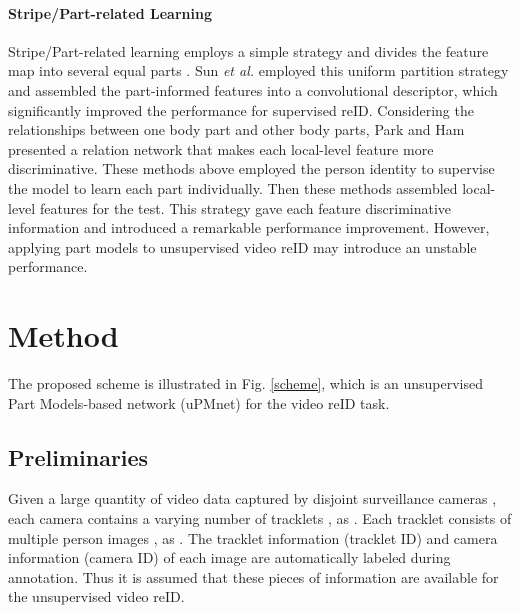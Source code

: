 \documentclass{cta-author}
\begin{document}
	\paragraph{Stripe/Part-related Learning}
	Stripe/Part-related learning employs a simple strategy and divides the feature map into several equal parts \cite{RN191} \cite{RN314}. Sun \textit{et al.} \cite{RN191} employed this uniform partition strategy and assembled the part-informed features into a convolutional descriptor, which significantly improved the performance for supervised reID. Considering the relationships between one body part and other body parts, Park and Ham \cite{RN314} presented a relation network that makes each local-level feature more discriminative. These methods above employed the person identity to supervise the model to learn each part individually. Then these methods assembled local-level features for the test. This strategy gave each feature discriminative information and introduced a remarkable performance improvement. However, applying part models to unsupervised video reID may introduce an unstable performance.
	
	
	\section{Method}\label{method}
	The proposed scheme is illustrated in Fig. \ref{scheme}, which is an unsupervised Part Models-based network (uPMnet) for the video reID task. 

	\subsection{Preliminaries}
	Given a large quantity of video data captured by disjoint surveillance cameras , each camera  contains a varying number of tracklets , as . Each tracklet  consists of multiple person images , as . The tracklet information (tracklet ID) and camera information (camera ID) of each image are automatically labeled during annotation. Thus it is assumed that these pieces of information are available for the unsupervised video reID. 
\end{document}
